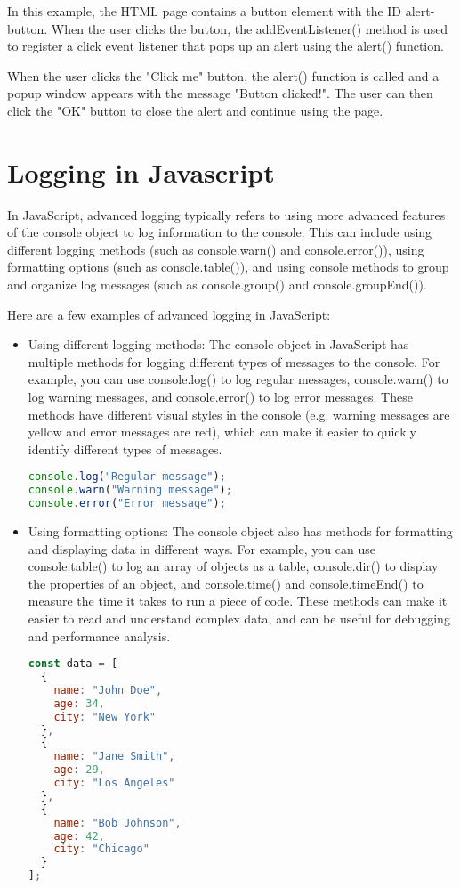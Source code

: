 {\begin{lstlisting}[language=Javascript, caption=Alert with HTML]
\end{lstlisting}

In this example, the HTML page contains a button element with the ID alert-button. When the user clicks the button, the addEventListener() method is used to register a click event listener that pops up an alert using the alert() function.

When the user clicks the "Click me" button, the alert() function is called and a popup window appears with the message "Button clicked!". The user can then click the "OK" button to close the alert and continue using the page.


\section{Logging in Javascript}
In JavaScript, advanced logging typically refers to using more advanced features of the console object to log information to the console. This can include using different logging methods (such as console.warn() and console.error()), using formatting options (such as console.table()), and using console methods to group and organize log messages (such as console.group() and console.groupEnd()).

Here are a few examples of advanced logging in JavaScript:

\begin{itemize}
\item Using different logging methods: The console object in JavaScript has multiple methods for logging different types of messages to the console. For example, you can use console.log() to log regular messages, console.warn() to log warning messages, and console.error() to log error messages. These methods have different visual styles in the console (e.g. warning messages are yellow and error messages are red), which can make it easier to quickly identify different types of messages.
\begin{lstlisting}[language=Javascript, caption=Example of console.log]
console.log("Regular message");
console.warn("Warning message");
console.error("Error message");
\end{lstlisting}
\item Using formatting options: The console object also has methods for formatting and displaying data in different ways. For example, you can use console.table() to log an array of objects as a table, console.dir() to display the properties of an object, and console.time() and console.timeEnd() to measure the time it takes to run a piece of code. These methods can make it easier to read and understand complex data, and can be useful for debugging and performance analysis.
\begin{lstlisting}[language=Javascript, caption=Example of console table and dir]
const data = [
  {
    name: "John Doe",
    age: 34,
    city: "New York"
  },
  {
    name: "Jane Smith",
    age: 29,
    city: "Los Angeles"
  },
  {
    name: "Bob Johnson",
    age: 42,
    city: "Chicago"
  }
];


\end{lstlisting}
\end{itemize}}
